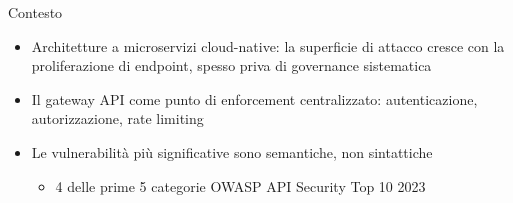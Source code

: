 %
%
%
%
%

\begin{frame}{Contesto}
    \begin{itemize}
        \item Architetture a \alert{microservizi} cloud-native: la superficie di attacco cresce con la \alert{proliferazione di endpoint}, spesso priva di governance sistematica

        \item Il \alert{gateway API} come punto di enforcement centralizzato: autenticazione, autorizzazione, rate limiting

        \item Le vulnerabilità più significative sono \alert{semantiche}, non sintattiche
              \begin{itemize}
                  \item 4 delle prime 5 categorie OWASP API Security Top 10 2023
              \end{itemize}
    \end{itemize}
\end{frame}
